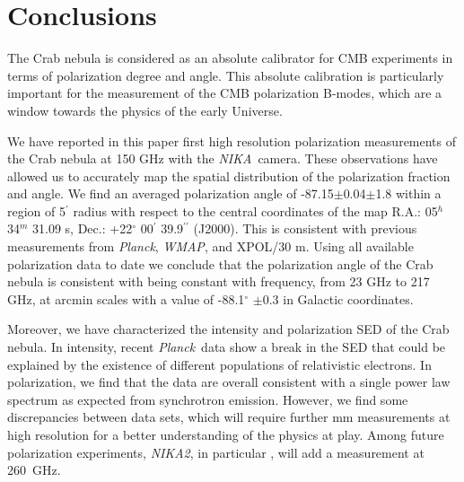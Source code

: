 \documentclass[twocolumn,traditabstract]{aa}
\def\NIKA{\textit{NIKA}}
\def\NIKAd{\textit{NIKA2}}
\def\Planck{\textit{Planck}}
\def\WMAP{\textit{WMAP}}
\begin{document}


\section{Conclusions}\label{sec:conclusions}
The Crab nebula is considered as an absolute calibrator for CMB experiments in
terms of polarization degree and angle. This absolute calibration is
particularly important for the measurement of the CMB polarization B-modes,
which are a window towards the physics of the early Universe.

We have reported in this paper first high resolution polarization measurements
of the Crab nebula at 150 GHz with the \NIKA\ camera. These observations have
allowed us to accurately map the spatial distribution of the polarization
fraction and angle.  We find an averaged polarization angle of
-87.15$\pm$0.04$\pm$1.8 within a region of 5$^\prime$ radius with respect to the
central coordinates of the map R.A.: 05$^{h}$ 34$^{m}$ 31.09 s, Dec.:
+22$^{\circ}$ 00$^{\prime}$ 39.9$^{\prime\prime}$ (J2000).  This is consistent with
previous measurements from \Planck, \WMAP, and XPOL/30 m.
Using all available polarization data to date we conclude that the
polarization angle of the Crab nebula is consistent with being constant with
frequency, from 23 GHz to 217 GHz, at arcmin scales with a value of
-88.1$^{\circ}$ $\pm$0.3 in Galactic coordinates.

Moreover, we have characterized the intensity and polarization SED of the Crab nebula. In intensity, recent \Planck\ data show a break in the SED that could be explained by the existence of different populations of relativistic electrons. In polarization, we find that the data are overall consistent with a single power law spectrum as expected from synchrotron emission. However, we find some discrepancies between data sets, which will require further mm measurements at high resolution for a better understanding of the physics at play. Among future polarization experiments, \NIKAd, in particular \citep{calvo2016}, will add a measurement at 260~GHz.
\end{document}
